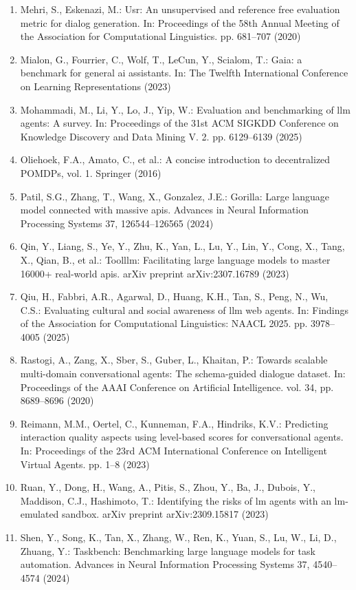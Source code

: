 \documentclass[11pt,UTF8,fontset=fandol]{ctexart}
\begin{document}
\begin{enumerate}[leftmargin=2em,labelsep=0.6em]
\item Mehri, S., Eskenazi, M.: Usr: An unsupervised and reference free evaluation metric for dialog generation. In: Proceedings of the 58th Annual Meeting of the Association for Computational Linguistics. pp. 681--707 (2020)
\item Mialon, G., Fourrier, C., Wolf, T., LeCun, Y., Scialom, T.: Gaia: a benchmark for general ai assistants. In: The Twelfth International Conference on Learning Representations (2023)
\item Mohammadi, M., Li, Y., Lo, J., Yip, W.: Evaluation and benchmarking of llm agents: A survey. In: Proceedings of the 31st ACM SIGKDD Conference on Knowledge Discovery and Data Mining V. 2. pp. 6129--6139 (2025)
\item Oliehoek, F.A., Amato, C., et al.: A concise introduction to decentralized POMDPs, vol. 1. Springer (2016)
\item Patil, S.G., Zhang, T., Wang, X., Gonzalez, J.E.: Gorilla: Large language model connected with massive apis. Advances in Neural Information Processing Systems 37, 126544--126565 (2024)
\item Qin, Y., Liang, S., Ye, Y., Zhu, K., Yan, L., Lu, Y., Lin, Y., Cong, X., Tang, X., Qian, B., et al.: Toolllm: Facilitating large language models to master 16000+ real-world apis. arXiv preprint arXiv:2307.16789 (2023)
\item Qiu, H., Fabbri, A.R., Agarwal, D., Huang, K.H., Tan, S., Peng, N., Wu, C.S.: Evaluating cultural and social awareness of llm web agents. In: Findings of the Association for Computational Linguistics: NAACL 2025. pp. 3978--4005 (2025)
\item Rastogi, A., Zang, X., Sber, S., Guber, L., Khaitan, P.: Towards scalable multi-domain conversational agents: The schema-guided dialogue dataset. In: Proceedings of the AAAI Conference on Artificial Intelligence. vol. 34, pp. 8689--8696 (2020)
\item Reimann, M.M., Oertel, C., Kunneman, F.A., Hindriks, K.V.: Predicting interaction quality aspects using level-based scores for conversational agents. In: Proceedings of the 23rd ACM International Conference on Intelligent Virtual Agents. pp. 1--8 (2023)
\item Ruan, Y., Dong, H., Wang, A., Pitis, S., Zhou, Y., Ba, J., Dubois, Y., Maddison, C.J., Hashimoto, T.: Identifying the risks of lm agents with an lm-emulated sandbox. arXiv preprint arXiv:2309.15817 (2023)
\item Shen, Y., Song, K., Tan, X., Zhang, W., Ren, K., Yuan, S., Lu, W., Li, D., Zhuang, Y.: Taskbench: Benchmarking large language models for task automation. Advances in Neural Information Processing Systems 37, 4540--4574 (2024)

\end{enumerate}
\end{document}
